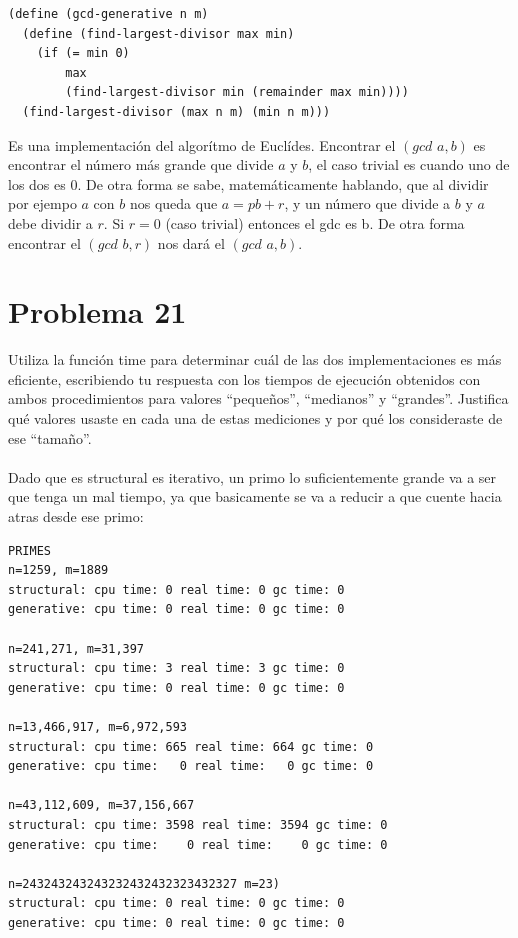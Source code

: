 \documentclass[a4paper,11pt]{article}
\theoremstyle{mytheor}
\begin{document}
\begin{lstlisting}[title = gcd-generative]
(define (gcd-generative n m)
  (define (find-largest-divisor max min)
    (if (= min 0)
        max
        (find-largest-divisor min (remainder max min))))
  (find-largest-divisor (max n m) (min n m)))
\end{lstlisting}

Es una implementación del algorítmo de Euclídes. Encontrar el $(gcd\,\, a, b)$ es encontrar el número más grande que divide $a$ y $b$, el caso trivial es cuando uno de los dos es 0. De otra forma se sabe, matemáticamente hablando, que al dividir por ejempo $ a$ con $b$ nos queda que $a = pb + r$, y  un número que divide a $b$ y $a$  debe dividir a $r$. Si $r=0$ (caso trivial) entonces el gdc es b. De otra forma encontrar el $(gcd\,\, b, r)$ nos dará el $(gcd\,\, a, b)$.

\section*{Problema 21}
Utiliza la función time para determinar cuál de las dos implementaciones es más
eficiente, escribiendo tu respuesta con los tiempos de ejecución obtenidos con ambos procedimientos
para valores “pequeños”, “medianos” y “grandes”. Justifica qué valores usaste en cada una de estas
mediciones y por qué los consideraste de ese “tamaño”. \\ \\

Dado que es structural es iterativo, un primo lo suficientemente grande va a ser que tenga un mal tiempo, ya que basicamente se va a reducir a que cuente hacia atras desde ese primo:
\begin{lstlisting}[title= gcd: structural vs generative]
PRIMES
n=1259, m=1889
structural: cpu time: 0 real time: 0 gc time: 0
generative: cpu time: 0 real time: 0 gc time: 0

n=241,271, m=31,397
structural: cpu time: 3 real time: 3 gc time: 0
generative: cpu time: 0 real time: 0 gc time: 0

n=13,466,917, m=6,972,593
structural: cpu time: 665 real time: 664 gc time: 0
generative: cpu time:   0 real time:   0 gc time: 0

n=43,112,609, m=37,156,667
structural: cpu time: 3598 real time: 3594 gc time: 0
generative: cpu time:    0 real time:    0 gc time: 0

n=243243243243232432432323432327 m=23)
structural: cpu time: 0 real time: 0 gc time: 0
generative: cpu time: 0 real time: 0 gc time: 0
\end{lstlisting}
\end{document}
